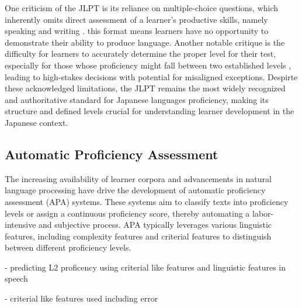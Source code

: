 One criticism of the JLPT is its reliance on multiple-choice questions, which inherently omits direct assessment of
a learner's productive skills, namely speaking and writing \citet{JLPTcriticism}. this format means learners have
no opportunity to demonstrate their ability to produce language. Another notable critique is the difficulty for
learners to accurately determine the proper level for their test, especially for those whose proficiency might fall
between two established levels \citep{JLPTcriticism}, leading to high-stakes decisions with potential for misaligned
exceptions. Despirte these acknowledged limitations, the JLPT remains the most widely
recognized and authoritative standard for Japanese languages proficiency, making its structure and defined levels
crucial for understanding learner development in the Japanese context.

\subsection{Automatic Proficiency Assessment}


The increasing availability of learner corpora and advancements in natural language processing have drive the
development of automatic proficiency assessment (APA) systems. These systems aim to classify texts into proficiency
levels or assign a continuous proficiency score, thereby automating a labor-intensive and subjective process. APA typically leverages various linguistic features, including complexity
features and criterial features to distinguish between different proficiency levels.


\citep{defino2022} - predicting L2 proficency using criterial like features and linguistic features in speech

\citep{tono2013} - criterial like features used including error

